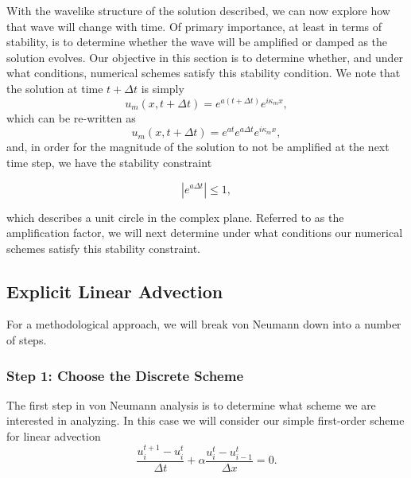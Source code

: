 With the wavelike structure of the solution described, we can now explore how that wave will change with time. Of primary importance, at least in terms of stability, is to determine whether the wave will be amplified or damped as the solution evolves. Our objective in this section is to determine whether, and under what conditions, numerical schemes satisfy this stability condition. We note that the solution at time $t+\Delta t$ is simply
\begin{equation}
	u_m(x,t+\Delta t) = e^{a(t+\Delta t)} e^{i \kappa_m x},
\end{equation}
which can be re-written as
\begin{equation}
	u_m(x,t+\Delta t) = e^{at}e^{a\Delta t} e^{i \kappa_m x},
\end{equation}
and, in order for the magnitude of the solution to not be amplified at the next time step, we have the stability constraint
\begin{eqBox}
\begin{equation}
	|e^{a\Delta t}| \leq 1,
\end{equation}
\end{eqBox}
which describes a unit circle in the complex plane. Referred to as the amplification factor, we will next determine under what conditions our numerical schemes satisfy this stability constraint.

\subsection{Explicit Linear Advection}
For a methodological approach, we will break von Neumann down into a number of steps.

\subsubsection{Step 1: Choose the Discrete Scheme}
The first step in von Neumann analysis is to determine what scheme we are interested in analyzing. In this case we will consider our simple first-order scheme for linear advection
\begin{equation}
	\frac{u_i^{t+1} - u_{i}^t}{\Delta t} +  \alpha \frac{u_i^t - u_{i-1}^t}{\Delta x} = 0.
\end{equation}


